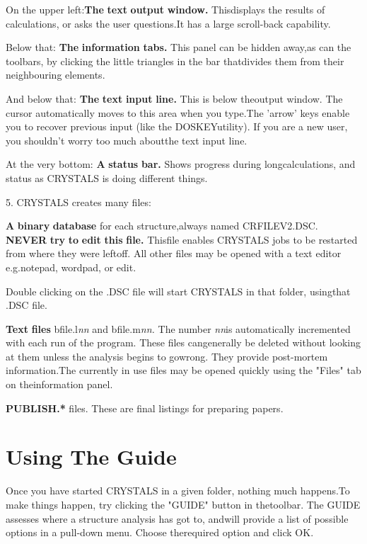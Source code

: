 \documentclass[10pt,a4paper]{report}
\begin{document}
 On the upper left:{\bf The} {\bf text} {\bf output} {\bf window.} Thisdisplays the results of calculations, or asks the user questions.It has a large scroll-back capability.

 Below that: {\bf The} {\bf information} {\bf tabs.} This panel can be hidden away,as can the toolbars, by clicking the little triangles in the bar thatdivides them from their neighbouring elements.

 And below that: {\bf The} {\bf text} {\bf input} {\bf line.} This is below theoutput window. The cursor automatically moves to this area when you type.The 'arrow' keys enable you to recover previous input (like the DOSKEYutility). If you are a new user, you shouldn't worry too much aboutthe text input line.

 At the very bottom: {\bf A} {\bf status} {\bf bar.} Shows progress during longcalculations, and status as CRYSTALS is doing different things.

5. CRYSTALS creates many files:

 {\bf A} {\bf binary} {\bf database} for each structure,always named CRFILEV2.DSC. {\bf NEVER} {\bf try} {\bf to} {\bf edit} {\bf this} {\bf file.} Thisfile enables CRYSTALS jobs to be restarted from where they were leftoff. All other files may be opened with a text editor e.g.notepad, wordpad, or edit.

 Double clicking on the .DSC file will start CRYSTALS in that folder, usingthat .DSC file.

 {\bf Text} {\bf files} bfile.l\emph{nn} and bfile.m\emph{nn.} The number \emph{nn}is automatically incremented with each run of the program. These files cangenerally be deleted without looking at them unless the analysis begins to gowrong. They provide post-mortem information.The currently in use files may be opened quickly using the "Files" tab on theinformation panel.

 {\bf PUBLISH.*} files. These are final listings for preparing papers.\chapter{Using The Guide}


 Once you have started CRYSTALS in a given folder, nothing much happens.To make things happen, try clicking the "GUIDE" button in thetoolbar. The GUIDE assesses where a structure analysis has got to, andwill provide a list of possible options in a pull-down menu. Choose therequired option and click OK.
\end{document}
